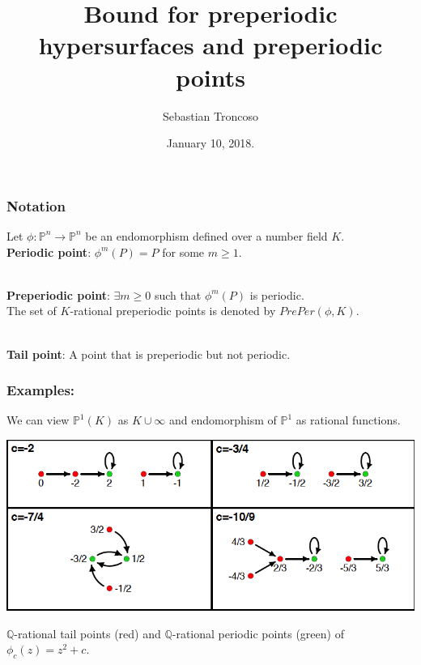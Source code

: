 \documentclass{beamer}
\title[Preperiodic hypersurfaces and points]{Bound for preperiodic hypersurfaces and preperiodic points}
\author[S. Troncoso]{Sebastian Troncoso}
\institute[BSC]{Birmingham-Southern College}
\date[ January 10, 2018.]{ January 10, 2018. \\ \vspace{1cm} }
\def\jump{ \quad \\ \vspace{0.5cm} \pause}
\def\PP{{\mathbb P}}
\def\QQ{{\mathbb Q}}
\theoremstyle{thmstyle}
\theoremstyle{mystyle}
\theoremstyle{qstnstyle}
\begin{document}
\begin{frame}
\titlepage
\end{frame}

\begin{frame}
\frametitle{Notation}
Let $\phi:\mathbb{P}^n\to\mathbb{P}^n$ be an endomorphism defined over a number field $K$.
\jump
\textbf{Periodic point}: $\phi^m(P)=P$ for some $m\geq{1}$.

\jump
\textbf{Preperiodic point}: $\exists m\geq{0}$ such that $\phi^m(P)$ is periodic.\\ 
The set of $K$-rational preperiodic points is denoted by $PrePer(\phi,K)$.

\jump
\textbf{Tail point}: A point that is preperiodic but not periodic.\\ 

\end{frame}

\begin{frame}
\frametitle{Examples:}
We can view $\mathbb{P}^1(K)$ as $K\cup\infty$ and endomorphism of $\PP^1$ as rational functions.
\begin{center}
\includegraphics[width=1.0\linewidth]{placeholder4}
\end{center}

$\QQ$-rational tail points (red) and $\QQ$-rational periodic points (green) of  $\phi_c(z)=z^2+c$.
\end{frame}
\end{document}
